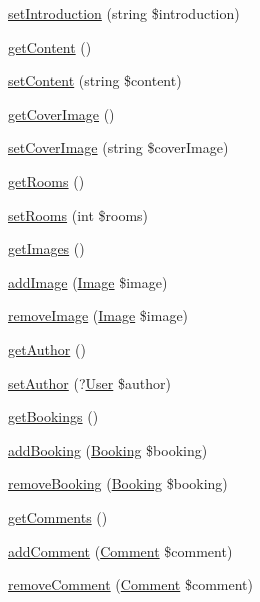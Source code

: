 \begin{DoxyCompactItemize}
\mbox{\hyperlink{class_app_1_1_entity_1_1_ad_a2783619c7c20ec3cdce7706c8e617324}{set\+Introduction}} (string \$introduction)
\item 
\mbox{\hyperlink{class_app_1_1_entity_1_1_ad_a58e43f09a06ce4e29b192c4e17ce7915}{get\+Content}} ()
\item 
\mbox{\hyperlink{class_app_1_1_entity_1_1_ad_a89b90bd7e4de551ffdaa3796cda3e9be}{set\+Content}} (string \$content)
\item 
\mbox{\hyperlink{class_app_1_1_entity_1_1_ad_af68dead1965a2a3240f96ae558e355f8}{get\+Cover\+Image}} ()
\item 
\mbox{\hyperlink{class_app_1_1_entity_1_1_ad_ae4d5ad27ff0c6741b3d362abe13275bc}{set\+Cover\+Image}} (string \$cover\+Image)
\item 
\mbox{\hyperlink{class_app_1_1_entity_1_1_ad_a00fbf4025aa40f365c0018f9631a3592}{get\+Rooms}} ()
\item 
\mbox{\hyperlink{class_app_1_1_entity_1_1_ad_a9e6a5245cd24ec7e44cfaa8e85cb008f}{set\+Rooms}} (int \$rooms)
\item 
\mbox{\hyperlink{class_app_1_1_entity_1_1_ad_a47d8b8b7d4c420a60823d02a21527ae1}{get\+Images}} ()
\item 
\mbox{\hyperlink{class_app_1_1_entity_1_1_ad_a25c5a91cf132b95f255c8e1bd537604c}{add\+Image}} (\mbox{\hyperlink{class_app_1_1_entity_1_1_image}{Image}} \$image)
\item 
\mbox{\hyperlink{class_app_1_1_entity_1_1_ad_ab3f007ff609fce4fe853b782702c5d36}{remove\+Image}} (\mbox{\hyperlink{class_app_1_1_entity_1_1_image}{Image}} \$image)
\item 
\mbox{\hyperlink{class_app_1_1_entity_1_1_ad_a5286e30390ae3e1b274940286493dd24}{get\+Author}} ()
\item 
\mbox{\hyperlink{class_app_1_1_entity_1_1_ad_adc1408587dab3390f96d6d8bf16324e5}{set\+Author}} (?\mbox{\hyperlink{class_app_1_1_entity_1_1_user}{User}} \$author)
\item 
\mbox{\hyperlink{class_app_1_1_entity_1_1_ad_a3dba7af3ac89f0c7c191024c2bcbf2e5}{get\+Bookings}} ()
\item 
\mbox{\hyperlink{class_app_1_1_entity_1_1_ad_a843c4ecdcf427fcc51745d213a56ee66}{add\+Booking}} (\mbox{\hyperlink{class_app_1_1_entity_1_1_booking}{Booking}} \$booking)
\item 
\mbox{\hyperlink{class_app_1_1_entity_1_1_ad_a5b4bef85b0d6ad2c0129284d14b5d2d8}{remove\+Booking}} (\mbox{\hyperlink{class_app_1_1_entity_1_1_booking}{Booking}} \$booking)
\item 
\mbox{\hyperlink{class_app_1_1_entity_1_1_ad_af3034ead082330d2c046a69814009808}{get\+Comments}} ()
\item 
\mbox{\hyperlink{class_app_1_1_entity_1_1_ad_aa8fd802a5ef6804bc4033103454fb0b6}{add\+Comment}} (\mbox{\hyperlink{class_app_1_1_entity_1_1_comment}{Comment}} \$comment)
\item 
\mbox{\hyperlink{class_app_1_1_entity_1_1_ad_aa6b3ffd74acaea9a5314d2cfdadae4a1}{remove\+Comment}} (\mbox{\hyperlink{class_app_1_1_entity_1_1_comment}{Comment}} \$comment)
\end{DoxyCompactItemize}


